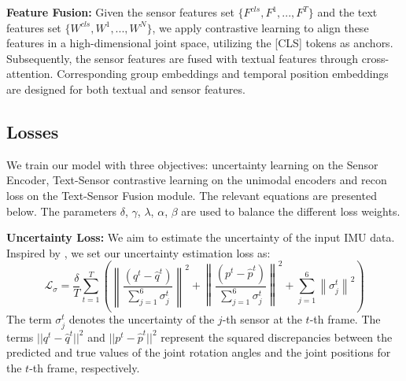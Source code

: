 \documentclass[letterpaper]{article} %
\begin{document}
\textbf{Feature Fusion:}
Given the sensor features set $\{{F^{cls}, F^{1}, ..., F^{T}}\}$ and the text features set $\{{W^{cls}, W^{1}, ..., W^{N}}\}$, we apply contrastive learning to align these features in a high-dimensional joint space, utilizing the [CLS] tokens as anchors.
Subsequently, the sensor features are fused with textual features through cross-attention. Corresponding group embeddings and temporal position embeddings are designed for both textual and sensor features.


\subsection{Losses}
We train our model with three objectives: uncertainty learning on the Sensor Encoder, Text-Sensor contrastive learning on the unimodal encoders and recon loss on the Text-Sensor Fusion module.
The relevant equations are presented below. The parameters $\delta$, $\gamma$, $\lambda$, $\alpha$, $\beta$ are used to balance the different loss weights.

\textbf{Uncertainty Loss:} We aim to estimate the uncertainty of the input IMU data. Inspired by \cite{kendall2017uncertainties}, we set our uncertainty estimation loss as:
\begin{equation}
\mathcal{L}_\sigma = \frac{\delta}{T} \sum_{t=1}^T(\left\|\frac{({q}^t-\hat q^t)}{ \sum_{j=1}^6\sigma_j^{t}}\right\|^2 + \left\|\frac{({p}^t-\hat p^t)}{ \sum_{j=1}^6\sigma_j^{t}}\right\|^2 +\sum_{j=1}^6\left\|\sigma_j^{t}\right\|^2)
\end{equation}
The term $\sigma_j^{t}$ denotes the uncertainty of the $j$-th sensor at the $t$-th frame. The terms $||{q}^t -\hat q^t||^2$ and $||{p}^t - \hat p^t||^2$ represent the squared discrepancies between the predicted and true values of the joint rotation angles and the joint positions for the $t$-th frame, respectively.
\end{document}
